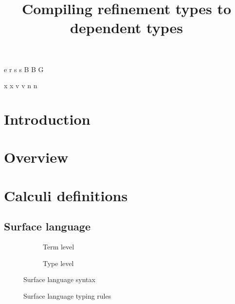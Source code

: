 \documentclass[a4paper]{article}
\begin{document}
\newnonterm e \varepsilon
{}
\newnonterm r \rho
{}
\newnonterm s s
\newnonterm B B
\newnonterm G \Gamma
{}

\newgterm x x
\newgterm v v
\newgterm n n


\title{Compiling refinement types to dependent types}

\maketitle

\section{Introduction}

\section{Overview}


\section{Calculi definitions}

\subsection{Surface language}

\begin{figure}[ht]
  \footnotesize
  \begin{subfigure}{.6\textwidth}
	\caption{Term level}
  \end{subfigure}
  \begin{subfigure}{.5\textwidth}
	\caption{Type level}
  \end{subfigure}
  \caption{Surface language syntax}
  \label{fig:surface_syntax}
\end{figure}

\begin{figure}[ht]
  \footnotesize
  \caption{Surface language typing rules}
  \label{fig:surface_typing}
\end{figure}
\end{document}
